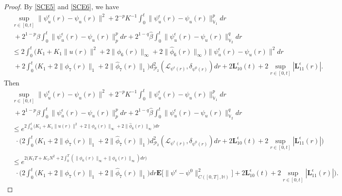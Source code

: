 \documentclass[10pt,a4paper]{amsart}
\renewcommand{\leq}{\leqslant}
\begin{document}
\begin{proof}
By \eqref{SCE5} and \eqref{SCE6}, we have
\begin{align}\label{SCE5-1}
&\sup_{r\in [0,t]}\|\psi^\epsilon_u(r)-\psi_u(r)\|^2
+2^{-p}K^{-1}\int_0^{t}
\|\psi^\epsilon_u(r)
-\psi_u(r)\|^p_{\dot{\mathbb{V}}_1}dr
\nonumber\\&\ +2^{1-p}\beta
\int_0^{t}
\|\psi^\epsilon_u(r)
-\psi_u(r)\|_{p}^{p}dr
+2^{1-q}\widehat{\beta}
\int_0^{t}\|\psi^\epsilon_u(r)
-\psi_u(r)\|_{\mathbb{V}_2}^{q}dr \nonumber\\
&\leq
2\int_0^{t}
\big(K_1
+K_1\|u(r)\|^2
+2\|\phi_6(r)\|_{\infty}+
2\|\widehat{\phi}_6(r)\|_{\infty}\big)\|\psi^\epsilon_u(r)
-\psi_u(r)
\|^2dr
\nonumber\\&\ + 2\int_0^{t}
\big(K_1+2 \|\phi_7(r)\|_{1}+
2\|\widehat{\phi}_7(r)\|_{1}\big)
d_{\mathcal{P}_2}^2
(\mathcal{L}_{
\psi^\epsilon(r)},\delta_{\psi^0(r)})dr
+2\textbf{L}^\epsilon_{10}(t)
+2\sup_{r\in[0,t]}|\textbf{L}^\epsilon_{11}(r)|.
\end{align}
Then
\begin{align}\label{SCE5-2}
&\sup_{r\in [0,t]}\|\psi^\epsilon_u(r)-\psi_u(r)\|^2
+2^{-p}K^{-1}\int_0^{t}
\|\psi^\epsilon_u(r)
-\psi_u(r)\|^p_{\dot{\mathbb{V}}_1}dr
\nonumber\\&\ +2^{1-p}\beta
\int_0^{t}
\|\psi^\epsilon_u(r)
-\psi_u(r)\|_{p}^{p}dr
+2^{1-q}\widehat{\beta}
\int_0^{t}\|\psi^\epsilon_u(r)
-\psi_u(r)\|_{\mathbb{V}_2}^{q}dr \nonumber\\
&\leq
e^{2\int_0^{t}
\big(K_1
+K_1\|u(r)\|^2
+2\|\phi_6(r)\|_{\infty}+
2\|\widehat{\phi}_6(r)\|_{\infty}\big)dr}
\nonumber\\&\ \ \cdot\Big( 2\int_0^{t}
\big(K_1+2 \|\phi_7(r)\|_{1}+
2\|\widehat{\phi}_7(r)\|_{1}\big)
d_{\mathcal{P}_2}^2
(\mathcal{L}_{
\psi^\epsilon(r)},\delta_{\psi^0(r)})dr
+2\textbf{L}^\epsilon_{10}(t)
+2\sup_{r\in[0,t]}|\textbf{L}^\epsilon_{11}(r)|
\Big)
\nonumber\\
&\leq
e^{2
\big(K_1 T
+K_1 N^2
+2 \int_0^T \left(\|\phi_6(r)\|_{\infty}+
\|\widehat{\phi}_6(r)\|_{\infty}\right)dr \big)}
\nonumber\\&\ \ \cdot \Big(2\int_0^{t}
\big(K_1+2 \|\phi_7(r)\|_{1}+
2\|\widehat{\phi}_7(r)\|_{1}\big)dr
\mathbf{E}\Big[
\| \psi^\epsilon-\psi^0\|^2_{C([0,T],\mathbb{H} )}\Big]
+2\textbf{L}^\epsilon_{10}(t)
+2\sup_{r\in[0,t]}|\textbf{L}^\epsilon_{11}(r)|
\Big).
\end{align}


\end{proof}
\end{document}

